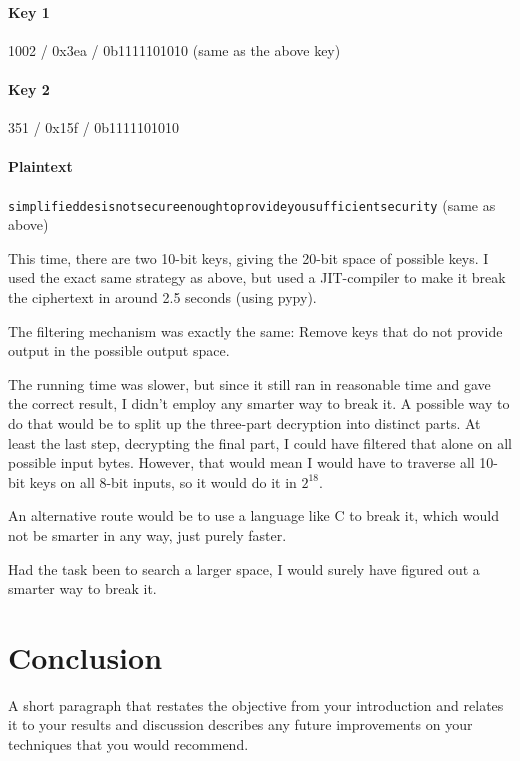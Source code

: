 \documentclass[a4paper,english,12pt]{article}
\begin{document}
\paragraph{Key 1} 1002 / 0x3ea / 0b1111101010 (same as the above key)
\paragraph{Key 2} 351 / 0x15f / 0b1111101010
\paragraph{Plaintext}
\texttt{simplifieddesisnotsecureenoughtoprovideyousufficientsecurity} (same as
above)

This time, there are two 10-bit keys, giving the 20-bit space of possible keys.
I used the exact same strategy as above, but used a JIT-compiler to make it
break the ciphertext in around 2.5 seconds (using pypy).

The filtering mechanism was exactly the same: Remove keys that do not provide
output in the possible output space.

The running time was slower, but since it still ran in reasonable time and gave
the correct result, I didn't employ any smarter way to break it. A possible way
to do that would be to split up the three-part decryption into distinct parts.
At least the last step, decrypting the final part, I could have filtered that
alone on all possible input bytes. However, that would mean I would have to
traverse all 10-bit keys on all 8-bit inputs, so it would do it in $2^{18}$.

An alternative route would be to use a language like C to break it, which would
not be smarter in any way, just purely faster.

Had the task been to search a larger space, I would surely have figured out a
smarter way to break it.

\section{Conclusion}

A short paragraph that restates the objective from your introduction and
relates it to your results and discussion describes any future improvements on
your techniques that you would recommend.



\end{document}
